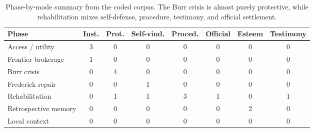 \begin{table}[t]
\centering
\small
\begin{tabular}{lccccccc}
\toprule
Phase & Inst. & Prot. & Self-vind. & Proced. & Official & Esteem & Testimony \\
\midrule
Access / utility & 3 & 0 & 0 & 0 & 0 & 0 & 0 \\
Frontier brokerage & 1 & 0 & 0 & 0 & 0 & 0 & 0 \\
Burr crisis & 0 & 4 & 0 & 0 & 0 & 0 & 0 \\
Frederick repair & 0 & 0 & 1 & 0 & 0 & 0 & 0 \\
Rehabilitation & 0 & 1 & 1 & 3 & 1 & 0 & 1 \\
Retrospective memory & 0 & 0 & 0 & 0 & 0 & 2 & 0 \\
Local context & 0 & 0 & 0 & 0 & 0 & 0 & 0 \\
\bottomrule
\end{tabular}
\caption{Phase-by-mode summary from the coded corpus. The Burr crisis is almost purely protective, while rehabilitation mixes self-defense, procedure, testimony, and official settlement.}
\label{tab:phasemodes}
\end{table}
